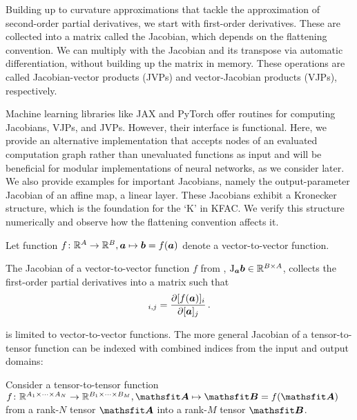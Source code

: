 Building up to curvature approximations that tackle the approximation of second-order partial derivatives, we start with first-order derivatives.
These are collected into a matrix called the Jacobian, which depends on the flattening convention.
We can multiply with the Jacobian and its transpose via automatic differentiation, without building up the matrix in memory.
These operations are called Jacobian-vector products (JVPs) and vector-Jacobian products (VJPs), respectively.

Machine learning libraries like JAX and PyTorch offer routines for computing Jacobians, VJPs, and JVPs.
However, their interface is functional.
Here, we provide an alternative implementation that accepts nodes of an evaluated computation graph rather than unevaluated functions as input and will be beneficial for modular implementations of neural networks, as we consider later.
We also provide examples for important Jacobians, namely the output-parameter Jacobian of an affine map, \ie a linear layer.
These Jacobians exhibit a Kronecker structure, which is the foundation for the `K' in KFAC.
We verify this structure numerically and observe how the flattening convention affects it.

\begin{setup}\label{setup:vector_to_vector_function}
  Let function $f\colon {\mathbb{R}}^A \to {\mathbb{R}}^B, {\bm{a}} \mapsto {\bm{b}} = f({\bm{a}})$ denote a vector-to-vector function.
\end{setup}

\begin{definition}\label{def:vector_jacobian}
  The Jacobian of a vector-to-vector function $f$ from , $\mathrm{J}_{{\bm{a}}}{\bm{b}} \in {\mathbb{R}}^{B \times A}$, collects the first-order partial derivatives into a matrix such that
  \begin{align*}
    [\jac_{\va} \vb]_{i,j} = \frac{\partial [f(\va)]_i}{\partial [\va]_j}\,.
  \end{align*}
\end{definition}
 is limited to vector-to-vector functions.
The more general Jacobian of a tensor-to-tensor function can be indexed with combined indices from the input and output domains:

\begin{setup}\label{setup:jacobians}
  Consider a tensor-to-tensor function $f\colon \sR^{A_1 \times \dots \times A_N} \to \sR^{B_1 \times \dots \times B_M}, \tA \mapsto \tB = f(\tA)$ from a rank-$N$ tensor $\tA$ into a rank-$M$ tensor $\tB$.
\end{setup}

